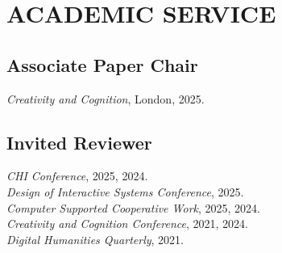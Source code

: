  \section{ACADEMIC SERVICE}

 \subsection{Associate Paper Chair}
  \emph{Creativity and Cognition}, London, 2025.\\
 
  \subsection{Invited Reviewer}
     \emph{CHI Conference}, 2025, 2024. \\
     \emph{Design of Interactive Systems Conference}, 2025. \\
     \emph{Computer Supported Cooperative Work}, 2025, 2024. \\
     \emph{Creativity and Cognition Conference}, 2021, 2024. \\
  \emph{Digital Humanities Quarterly}, 2021. \\
